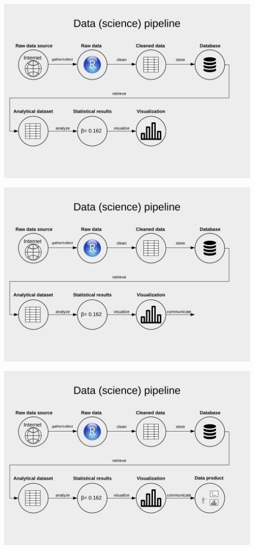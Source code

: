 \documentclass[
  ignorenonframetext,
]{beamer}
\begin{document}
\begin{frame}
\begin{center}\includegraphics[width=0.9\linewidth]{../../img/ds13} \end{center}
\end{frame}

\begin{frame}
\begin{center}\includegraphics[width=0.9\linewidth]{../../img/ds14} \end{center}
\end{frame}

\begin{frame}
\begin{center}\includegraphics[width=0.9\linewidth]{../../img/data_science_pipeline} \end{center}
\end{frame}
\end{document}
